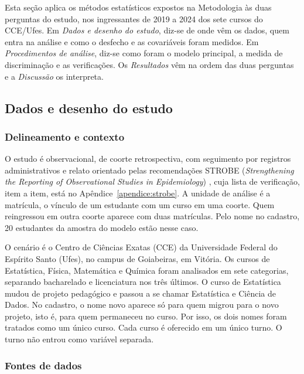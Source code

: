 \documentclass[12pt,a4paper]{article}
\begin{document}
Esta seção aplica os métodos estatísticos expostos na Metodologia às duas perguntas do estudo, nos ingressantes de 2019 a 2024 dos sete cursos do CCE/Ufes. Em \textit{Dados e desenho do estudo}, diz-se de onde vêm os dados, quem entra na análise e como o desfecho e as covariáveis foram medidos. Em \textit{Procedimentos de análise}, diz-se como foram o modelo principal, a medida de discriminação e as verificações. Os \textit{Resultados} vêm na ordem das duas perguntas e a \textit{Discussão} os interpreta.

\subsection{Dados e desenho do estudo}
\label{sec:dados}

\subsubsection{Delineamento e contexto}
\label{sec:delineamento}

O estudo é observacional, de coorte retrospectiva, com seguimento por registros administrativos e relato orientado pelas recomendações STROBE (\textit{Strengthening the Reporting of Observational Studies in Epidemiology}) \citep{vonelm2007strobe,vandenbroucke2007strobe}, cuja lista de verificação, item a item, está no Apêndice~\ref{apendice:strobe}. A unidade de análise é a matrícula, o vínculo de um estudante com um curso em uma coorte. Quem reingressou em outra coorte aparece com duas matrículas. Pelo nome no cadastro, 20 estudantes da amostra do modelo estão nesse caso.

O cenário é o Centro de Ciências Exatas (CCE) da Universidade Federal do Espírito Santo (Ufes), no campus de Goiabeiras, em Vitória. Os cursos de Estatística, Física, Matemática e Química foram analisados em sete categorias, separando bacharelado e licenciatura nos três últimos. O curso de Estatística mudou de projeto pedagógico e passou a se chamar Estatística e Ciência de Dados. No cadastro, o nome novo aparece só para quem migrou para o novo projeto, isto é, para quem permaneceu no curso. Por isso, os dois nomes foram tratados como um único curso. Cada curso é oferecido em um único turno. O turno não entrou como variável separada.

\subsubsection{Fontes de dados}
\label{sec:fontes}
\end{document}
